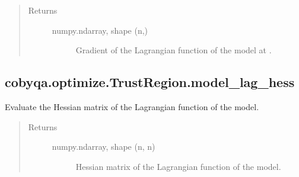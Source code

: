 \documentclass[letterpaper,10pt,english]{sphinxmanual}
\begin{document}
\begin{fulllineitems}
\begin{fulllineitems}
\begin{quote}
\begin{description}
\begin{description}
\end{description}

\item[{Returns}] \leavevmode\begin{description}
\item[{numpy.ndarray, shape (n,)}] \leavevmode
\sphinxAtStartPar
Gradient of the Lagrangian function of the model at .

\end{description}

\end{description}\end{quote}

\end{fulllineitems}



\subsection{cobyqa.optimize.TrustRegion.model\_lag\_hess}
\label{\detokenize{refs/generated/cobyqa.optimize.TrustRegion.model_lag_hess:cobyqa-optimize-trustregion-model-lag-hess}}\label{\detokenize{refs/generated/cobyqa.optimize.TrustRegion.model_lag_hess::doc}}

\begin{fulllineitems}
\label{\detokenize{refs/generated/cobyqa.optimize.TrustRegion.model_lag_hess:cobyqa.optimize.TrustRegion.model_lag_hess}}
\sphinxAtStartPar
Evaluate the Hessian matrix of the Lagrangian function of the model.
\begin{quote}\begin{description}
\item[{Returns}] \leavevmode\begin{description}
\item[{numpy.ndarray, shape (n, n)}] \leavevmode
\sphinxAtStartPar
Hessian matrix of the Lagrangian function of the model.

\end{description}

\end{description}\end{quote}

\end{fulllineitems}




\end{fulllineitems}
\end{document}
